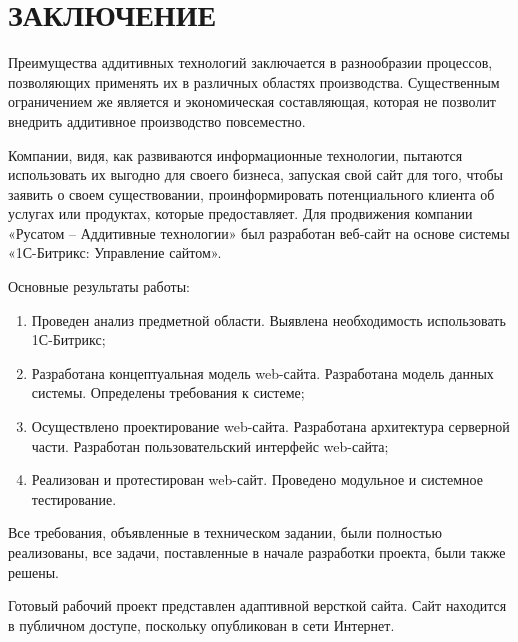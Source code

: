 \section*{ЗАКЛЮЧЕНИЕ}

Преимущества аддитивных технологий заключается в разнообразии процессов, позволяющих применять их в различных областях производства. Существенным ограничением же является и экономическая составляющая, которая не позволит внедрить аддитивное производство повсеместно.
  
Компании, видя, как развиваются информационные технологии, пытаются использовать их выгодно для своего бизнеса, запуская свой сайт для того, чтобы заявить о своем существовании, проинформировать потенциального клиента об услугах или продуктах, которые предоставляет. 
Для продвижения компании «Русатом – Аддитивные технологии» был разработан веб-сайт на основе системы «1С-Битрикс: Управление сайтом».

Основные результаты работы:

\begin{enumerate}
\item Проведен анализ предметной области. Выявлена необходимость использовать 1С-Битрикс;
\item Разработана концептуальная модель web-сайта. Разработана модель данных системы. Определены требования к системе;
\item Осуществлено проектирование web-сайта. Разработана архитектура серверной части. Разработан пользовательский интерфейс web-сайта;
\item Реализован и протестирован web-сайт. Проведено модульное и системное тестирование.
\end{enumerate}

Все требования, объявленные в техническом задании, были полностью реализованы, все задачи, поставленные в начале разработки проекта, были также решены.

Готовый рабочий проект представлен адаптивной версткой сайта. Сайт находится в публичном доступе, поскольку опубликован в сети Интернет.  
